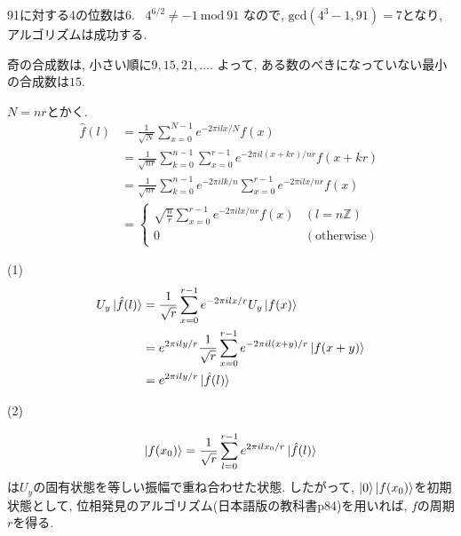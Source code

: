 \begin{ex}
    \label{ex5.18}
    91に対する4の位数は6. \ $4^{6/2} \neq -1 \ \mathrm{mod}\  91$ なので, $\mathrm{gcd}(4^3 - 1,91) = 7$となり, アルゴリズムは成功する.
\end{ex}

\begin{ex}
    \label{ex5.19}
    奇の合成数は, 小さい順に$9,15,21,\dots$. よって, ある数のべきになっていない最小の合成数は$15$.
\end{ex}

\begin{ex}
    \label{ex5.20}
    $N = nr$とかく.
    \begin{align*}
        \hat{f}(l)
         & = \frac{1}{\sqrt{N}} \sum_{x=0}^{N-1} e^{-2 \pi i l x / N} f(x)
        \\
         & =\frac{1}{\sqrt{nr}} \sum_{k=0}^{n-1} \sum_{x=0}^{r-1} e^{-2 \pi i l (x+kr) / nr} f(x+kr)
        \\
         & = \frac{1}{\sqrt{nr}} \sum_{k=0}^{n-1} e^{-2 \pi i l k / n} \sum_{x=0}^{r-1} e^{-2 \pi i l x / nr} f(x)
        \\
         & =
        \begin{cases}
            \sqrt{\frac{n}{r}} \sum_{x=0}^{r-1} e^{-2 \pi i l x / nr} f(x) & (l = n \mathbb{Z})   \\
            0                                                              & (\mathrm{otherwise})
        \end{cases}
    \end{align*}
\end{ex}

\begin{ex}
    \label{ex5.21}
    (1)
    \begin{align*}
        U_y \ket{ \hat{f}(l)}
         & = \frac{1}{\sqrt{r}} \sum_{x=0}^{r-1} e^{- 2 \pi i l x/r} U_y \ket{f(x)}                      \\
         & =  e^{2 \pi i ly/r} \frac{1}{\sqrt{r}} \sum_{x=0}^{r-1} e^{- 2 \pi i l( x + y)/r}\ket{f(x+y)} \\
         & =
        e^{2 \pi i ly/r} \ket{ \hat{f}(l)}
    \end{align*}
    \par
    (2)
    \par
    \begin{align*}
        \ket{f(x_0)}= \frac{1}{\sqrt{r}} \sum_{l=0}^{r-1} e^{2 \pi i l x_0 / r} \ket{\hat{f}(l)}
    \end{align*}
    は$U_y$の固有状態を等しい振幅で重ね合わせた状態. したがって, $\ket{0}\ket{f(x_0)}$を初期状態として, 位相発見のアルゴリズム(日本語版の教科書p84)を用いれば, $f$の周期$r$を得る.
\end{ex}